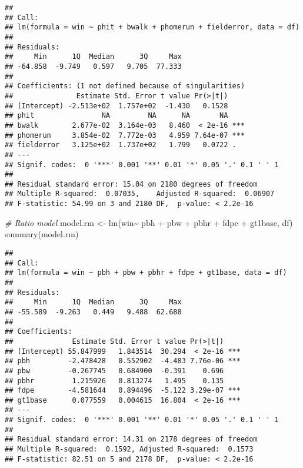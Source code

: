 \documentclass[
]{article}
\newenvironment{Shaded}{\begin{snugshade}}{\end{snugshade}}
\newcommand{\CommentTok}[1]{\textcolor[rgb]{0.56,0.35,0.01}{\textit{#1}}}
\newcommand{\FunctionTok}[1]{\textcolor[rgb]{0.00,0.00,0.00}{#1}}
\newcommand{\NormalTok}[1]{#1}
\newcommand{\OtherTok}[1]{\textcolor[rgb]{0.56,0.35,0.01}{#1}}
\newcommand{\SpecialCharTok}[1]{\textcolor[rgb]{0.00,0.00,0.00}{#1}}
\begin{document}
\begin{verbatim}
## 
## Call:
## lm(formula = win ~ phit + bwalk + phomerun + fielderror, data = df)
## 
## Residuals:
##     Min      1Q  Median      3Q     Max 
## -64.858  -9.749   0.597   9.705  77.333 
## 
## Coefficients: (1 not defined because of singularities)
##               Estimate Std. Error t value Pr(>|t|)    
## (Intercept) -2.513e+02  1.757e+02  -1.430   0.1528    
## phit                NA         NA      NA       NA    
## bwalk        2.677e-02  3.164e-03   8.460  < 2e-16 ***
## phomerun     3.854e-02  7.772e-03   4.959 7.64e-07 ***
## fielderror   3.125e+02  1.737e+02   1.799   0.0722 .  
## ---
## Signif. codes:  0 '***' 0.001 '**' 0.01 '*' 0.05 '.' 0.1 ' ' 1
## 
## Residual standard error: 15.04 on 2180 degrees of freedom
## Multiple R-squared:  0.07035,    Adjusted R-squared:  0.06907 
## F-statistic: 54.99 on 3 and 2180 DF,  p-value: < 2.2e-16
\end{verbatim}

\begin{Shaded}
\begin{Highlighting}[]
\CommentTok{\# Ratio model}
\NormalTok{model.rm }\OtherTok{\textless{}{-}} \FunctionTok{lm}\NormalTok{(win}\SpecialCharTok{\textasciitilde{}}\NormalTok{ pbh }\SpecialCharTok{+}\NormalTok{ pbw }\SpecialCharTok{+}\NormalTok{ pbhr }\SpecialCharTok{+}\NormalTok{  fdpe }\SpecialCharTok{+}\NormalTok{ gt1base, df)}
\FunctionTok{summary}\NormalTok{(model.rm)}
\end{Highlighting}
\end{Shaded}

\begin{verbatim}
## 
## Call:
## lm(formula = win ~ pbh + pbw + pbhr + fdpe + gt1base, data = df)
## 
## Residuals:
##     Min      1Q  Median      3Q     Max 
## -55.589  -9.263   0.449   9.488  62.688 
## 
## Coefficients:
##              Estimate Std. Error t value Pr(>|t|)    
## (Intercept) 55.847999   1.843514  30.294  < 2e-16 ***
## pbh         -2.478428   0.552902  -4.483 7.76e-06 ***
## pbw         -0.267745   0.684900  -0.391    0.696    
## pbhr         1.215926   0.813274   1.495    0.135    
## fdpe        -4.581644   0.894496  -5.122 3.29e-07 ***
## gt1base      0.077559   0.004615  16.804  < 2e-16 ***
## ---
## Signif. codes:  0 '***' 0.001 '**' 0.01 '*' 0.05 '.' 0.1 ' ' 1
## 
## Residual standard error: 14.31 on 2178 degrees of freedom
## Multiple R-squared:  0.1592, Adjusted R-squared:  0.1573 
## F-statistic: 82.51 on 5 and 2178 DF,  p-value: < 2.2e-16
\end{verbatim}
\end{document}
